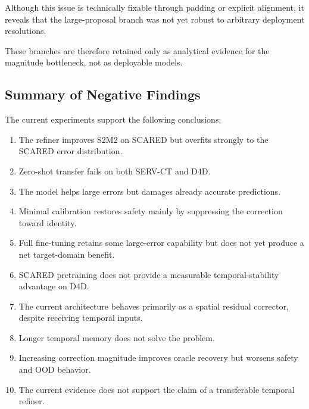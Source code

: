 \documentclass[11pt,a4paper]{article}
\begin{document}
Although this issue is technically fixable through padding or explicit alignment,
it reveals that the large-proposal branch was not yet robust to arbitrary deployment
resolutions.

These branches are therefore retained only as analytical evidence for the
magnitude bottleneck, not as deployable models.

\subsection{Summary of Negative Findings}

The current experiments support the following conclusions:

\begin{enumerate}[leftmargin=*]
    \item The refiner improves S2M2 on SCARED but overfits strongly to the SCARED
    error distribution.

    \item Zero-shot transfer fails on both SERV-CT and D4D.

    \item The model helps large errors but damages already accurate predictions.

    \item Minimal calibration restores safety mainly by suppressing the correction
    toward identity.

    \item Full fine-tuning retains some large-error capability but does not yet
    produce a net target-domain benefit.

    \item SCARED pretraining does not provide a measurable temporal-stability
    advantage on D4D.

    \item The current architecture behaves primarily as a spatial residual
    corrector, despite receiving temporal inputs.

    \item Longer temporal memory does not solve the problem.

    \item Increasing correction magnitude improves oracle recovery but worsens
    safety and OOD behavior.

    \item The current evidence does not support the claim of a transferable
    temporal refiner.
\end{enumerate}
\end{document}

